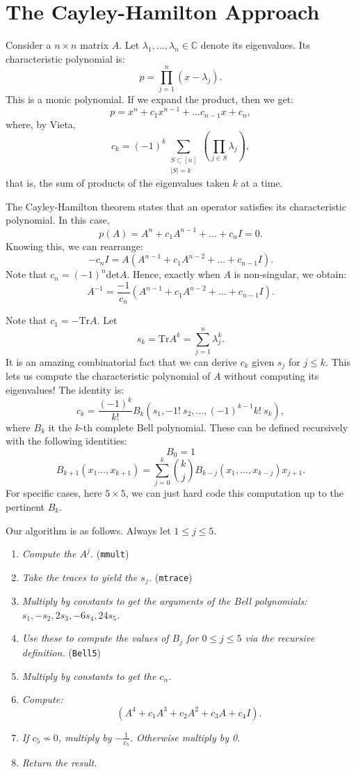 \documentclass{amsart}
\begin{document}
\section*{The Cayley-Hamilton Approach}

Consider a $n \times n $ matrix $A$. Let $\lambda_1, \ldots, \lambda_n \in \mathbb{C}$ denote its eigenvalues. Its characteristic polynomial is:
\[p=\prod_{j=1}^n(x - \lambda_j).\]
This is a monic polynomial. If we expand the product, then we get:
\[p=x^n + c_1 x^{n-1} + \ldots c_{n-1}x + c_n,\]
where, by Vieta,
\[c_k = (-1)^k\sum_{\substack{S \subset [n]\\|S| = k}} \left( \prod_{j \in S} \lambda_{j} \right),\]
that is, the sum of products of the eigenvalues taken $k$ at a time.

The Cayley-Hamilton theorem states that an operator satisfies its characteristic polynomial. In this case,
\[p(A)= A^n + c_1 A^{n-1} + \ldots + c_n I = 0.\]
Knowing this, we can rearrange:
\[-c_n I = A \left(A^{n-1} + c_1 A^{n-2} + \ldots + c_{n-1} I \right).\]
Note that $c_n = (-1)^n\text{det}A$. Hence, exactly when $A$ is non-singular, we obtain:
\[A^{-1} = \frac{-1}{c_n}\left(A^{n-1} + c_1 A^{n-2} + \ldots + c_{n-1} I \right).\]


Note that $c_1 = -\text{Tr}A$. Let
\[s_k = \text{Tr}A^k = \sum_{j = 1}^n \lambda_j^k.\]
It is an amazing combinatorial fact that we can derive $c_k$ given $s_j$ for $j \leq k$. This lets us compute the characteristic polynomial of $A$ without computing its eigenvalues! The identity is:
\[c_k = \frac{(-1)^k}{k!}B_k\left(s_1, -1!\ s_2, \ldots, (-1)^{k-1} k!\ s_k\right),\]
where $B_k$ it the $k$-th complete Bell polynomial. These can be defined recursively with the following identities:
\[B_0 = 1\]
\[B_{k+1}(x_1\ldots, x_{k+1}) = \sum_{j=0}^k \binom{k}{j} B_{k-j}(x_1, \ldots, x_{k-j}) x_{j+1}.\]
For specific cases, here $5 \times 5$, we can just hard code this computation up to the pertinent $B_k$.

\vspace{0.5cm}

Our algorithm is as follows. Always let $1 \leq j \leq 5$.
\begin{enumerate}[i]
    \item \textit{Compute the $A^j$.} (\texttt{mmult})
    \item \textit{Take the traces to yield the $s_j$.}  (\texttt{mtrace})
    \item \textit{Multiply by constants to get the arguments of the Bell polynomials: $s_1, -s_2, 2s_3, -6s_4, 24s_5$.}
    \item \textit{Use these to compute the values of $B_j$ for $0 \leq j \leq 5$ via the recursive definition.} (\texttt{Bell5})
    \item \textit{Multiply by constants to get the $c_n$.}
    \item \textit{Compute:}
    \[\left(A^{4} + c_1 A^{3} + c_2 A^{2} + c_3 A + c_4 I \right).\]
    \item \textit{If $c_5 \nsim 0$, multiply by $-\frac{1}{c_5}$. Otherwise multiply by 0.}
    \item \textit{Return the result.}
\end{enumerate}
\end{document}
